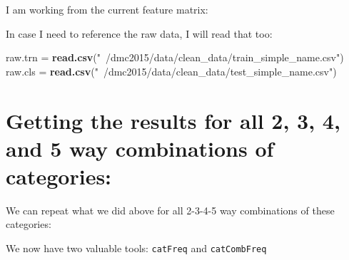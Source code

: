 \documentclass[10pt]{report}
\newenvironment{Shaded}{}{}
\newcommand{\KeywordTok}[1]{\textcolor[rgb]{0.00,0.44,0.13}{\textbf{{#1}}}}
\newcommand{\DataTypeTok}[1]{\textcolor[rgb]{0.56,0.13,0.00}{{#1}}}
\newcommand{\StringTok}[1]{\textcolor[rgb]{0.25,0.44,0.63}{{#1}}}
\newcommand{\CommentTok}[1]{\textcolor[rgb]{0.38,0.63,0.69}{\textit{{#1}}}}
\newcommand{\NormalTok}[1]{{#1}}
\begin{document}
I am working from the current feature matrix:

\begin{Shaded}
\end{Shaded}

In case I need to reference the raw data, I will read that too:

\begin{Shaded}
\begin{Highlighting}[]
   \NormalTok{raw.trn =}\StringTok{ }\KeywordTok{read.csv}\NormalTok{(}\StringTok{"~/dmc2015/data/clean_data/train_simple_name.csv"}\NormalTok{)}
   \NormalTok{raw.cls =}\StringTok{ }\KeywordTok{read.csv}\NormalTok{(}\StringTok{"~/dmc2015/data/clean_data/test_simple_name.csv"}\NormalTok{)}
\end{Highlighting}
\end{Shaded}

\section{Getting the results for all 2, 3, 4, and 5 way combinations of
categories:}\label{getting-the-results-for-all-2-3-4-and-5-way-combinations-of-categories}

We can repeat what we did above for all 2-3-4-5 way combinations of
these categories:

We now have two valuable tools: \verb!catFreq! and \verb!catCombFreq!
\end{document}
